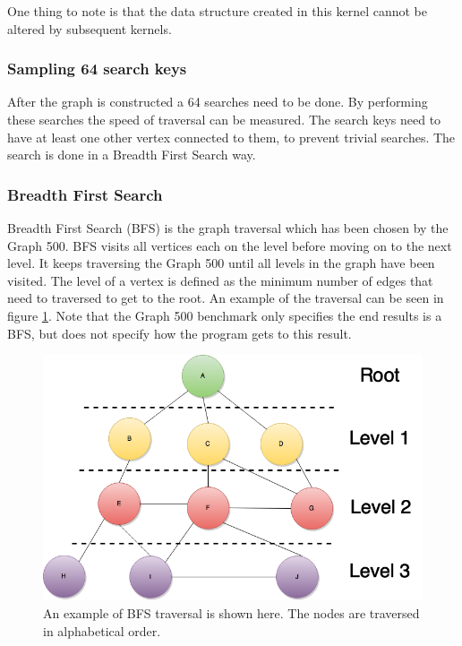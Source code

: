 One thing to note is that the data structure created in this kernel cannot be altered by subsequent kernels. 

\subsubsection{Sampling 64 search keys}
After the graph is constructed a 64 searches need to be done. By performing these searches the speed of traversal can be measured. The search keys need to have at least one other vertex connected to them, to prevent trivial searches. The search is done in a Breadth First Search way.

\subsubsection{Breadth First Search}
Breadth First Search\cite{bfs} (BFS) is the graph traversal which has been chosen by the Graph 500. BFS visits all vertices each on the level before moving on to the next level. It keeps traversing the Graph 500 until all levels in the graph have been visited. The level of a vertex is defined as the minimum number of edges that need to traversed to get to the root. An example of the traversal can be seen in figure \ref{fig:bfs}. 
Note that the Graph 500 benchmark only specifies the end results is a BFS, but does not specify how the program gets to this result.
\begin{figure}[!h]
	\includegraphics[width=\textwidth]{images/BFS-example1-with-levels}
	\caption{An example of BFS traversal is shown here. The nodes are traversed in alphabetical order.}
	\label{fig:bfs}
\end{figure}

